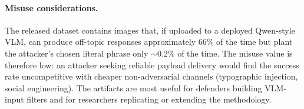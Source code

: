 \paragraph{Misuse considerations.}
The released dataset contains images that, if uploaded to a deployed Qwen-style VLM, can produce off-topic responses approximately $66\%$ of the time but plant the attacker's chosen literal phrase only $\sim 0.2\%$ of the time. The misuse value is therefore low: an attacker seeking reliable payload delivery would find the success rate uncompetitive with cheaper non-adversarial channels (typographic injection, social engineering). The artifacts are most useful for defenders building VLM-input filters and for researchers replicating or extending the methodology.
